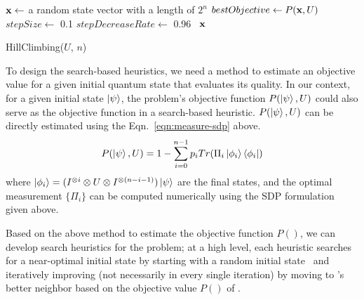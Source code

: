 \begin{algorithm}[ht] 
	$\mathbf{x} \leftarrow$ a random state vector with a length of $2^{n}$\;
	$bestObjective \leftarrow P(\mathbf{x}, U)$ \;
        $stepSize \leftarrow$ 0.1 \;
        $stepDecreaseRate \leftarrow$ 0.96\ \;
	\Return $\mathbf{x}$ \;
	\caption{HillClimbing($U$, $n$)}
\label{algo:hill-climbing}
\end{algorithm}


To design the search-based heuristics, we need a method to estimate an objective value for a given initial quantum state that evaluates its quality.
In our context, for a given initial state $\ket{\psi}$, 
the \iso problem's objective function $P(\ket{\psi}, U)$ could
also serve as the objective function in a search-based heuristic.
$P(\ket{\psi}, U)$ can be directly estimated
using the Eqn.~\ref{eqn:measure-sdp} above.
\begin{equation}
P(\ket{\psi}, U) = 1-\sum_{i=0}^{n-1} p_{i} Tr(\Pi_{i}  \ket{\phi_i}\bra{\phi_i})
\label{eqn:objective}
\end{equation}
\noindent
where $\ket{\phi_i} = (I^{\otimes i} \otimes U \otimes I^{\otimes (n-i-1)})\ket{\psi}$ are the final states, and the optimal measurement $\{\Pi_i\}$ can be computed numerically using the SDP formulation given above. 

Based on the above method to estimate the objective function $P()$, we can develop  search heuristics for the \iso problem; 
at a high level, each heuristic searches for a near-optimal initial state by starting with a random initial state \vx\ and iteratively improving (not necessarily in every single iteration) by moving to \vx's better neighbor based on the objective value $P()$ of \vx. 

